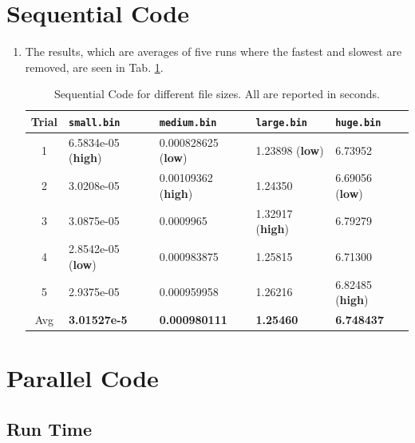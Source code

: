 \documentclass[a4paper,12pt]{article}
\theoremstyle{definition}
\theoremstyle{remark}
\begin{document}
	\section{Sequential Code}
	\begin{enumerate}
		\item The results, which are averages of five runs where the fastest and slowest are removed, are seen in Tab. \ref{tab:Seq}.
		\begin{table}[h]
			\centering
			\begin{tabular}{|c|l|l|l|l|}
				\hline
				\textbf{Trial}& \texttt{small.bin} & \texttt{medium.bin}  & \texttt{large.bin} & \texttt{huge.bin} \\
				\hline\hline
					1&  6.5834e-05  (\textbf{high})	& 0.000828625 (\textbf{low})&1.23898	(\textbf{low})&6.73952	\\
					2&   3.0208e-05	&0.00109362	 (\textbf{high})	&1.24350	&6.69056 (\textbf{low})	\\
					3&   3.0875e-05&0.0009965	&	 1.32917 (\textbf{high})&6.79279\\
					4&     2.8542e-05 (\textbf{low}) & 0.000983875	&	1.25815&6.71300\\
					5&    2.9375e-05	& 0.000959958	& 1.26216	&6.82485 (\textbf{high}) \\
					\hline
					Avg&  \textbf{3.01527e-5} &	\textbf{0.000980111}& \textbf{1.25460}	&\textbf{6.748437}\\
				\hline
			\end{tabular}
			\caption{Sequential Code for different file sizes. All are reported in seconds.}
			\label{tab:Seq}
		\end{table}
	\end{enumerate}
	\section{Parallel Code}
	\subsection{Run Time}
\end{document}
